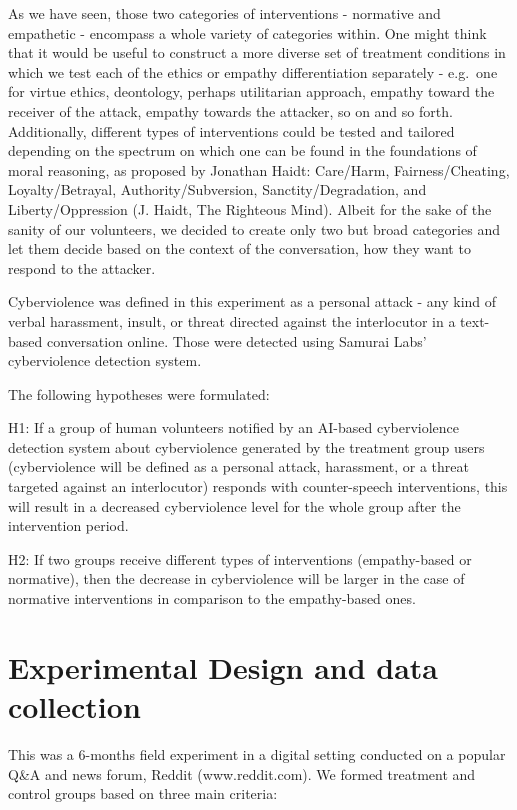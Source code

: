 \documentclass[
  10pt,
  dvipsnames,enabledeprecatedfontcommands]{scrartcl}
\begin{document}
As we have seen, those two categories of interventions - normative and
empathetic - encompass a whole variety of categories within. One might
think that it would be useful to construct a more diverse set of
treatment conditions in which we test each of the ethics or empathy
differentiation separately - e.g.~one for virtue ethics, deontology,
perhaps utilitarian approach, empathy toward the receiver of the attack,
empathy towards the attacker, so on and so forth. Additionally,
different types of interventions could be tested and tailored depending
on the spectrum on which one can be found in the foundations of moral
reasoning, as proposed by Jonathan Haidt: Care/Harm, Fairness/Cheating,
Loyalty/Betrayal, Authority/Subversion, Sanctity/Degradation, and
Liberty/Oppression (J. Haidt, The Righteous Mind). Albeit for the sake
of the sanity of our volunteers, we decided to create only two but broad
categories and let them decide based on the context of the conversation,
how they want to respond to the attacker.

Cyberviolence was defined in this experiment as a personal attack - any
kind of verbal harassment, insult, or threat directed against the
interlocutor in a text-based conversation online. Those were detected
using Samurai Labs' cyberviolence detection system.

The following hypotheses were formulated:

H1: If a group of human volunteers notified by an AI-based cyberviolence
detection system about cyberviolence generated by the treatment group
users (cyberviolence will be defined as a personal attack, harassment,
or a threat targeted against an interlocutor) responds with
counter-speech interventions, this will result in a decreased
cyberviolence level for the whole group after the intervention period.

H2: If two groups receive different types of interventions
(empathy-based or normative), then the decrease in cyberviolence will be
larger in the case of normative interventions in comparison to the
empathy-based ones.

\hypertarget{experimental-design-and-data-collection}{%
\section{Experimental Design and data
collection}\label{experimental-design-and-data-collection}}

This was a 6-months field experiment in a digital setting conducted on a
popular Q\&A and news forum, Reddit (www.reddit.com). We formed
treatment and control groups based on three main criteria:
\end{document}
